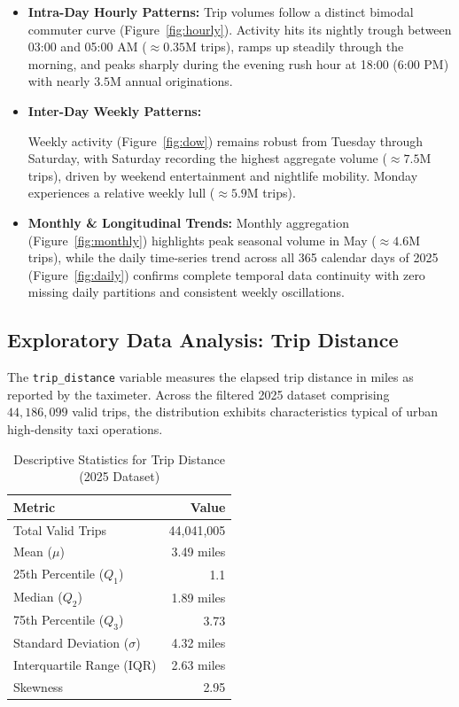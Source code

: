 \documentclass[11pt,a4paper]{article}
\begin{document}
\begin{itemize}
    \item \textbf{Intra-Day Hourly Patterns:}
     Trip volumes follow a distinct bimodal commuter curve (Figure~\ref{fig:hourly}). Activity hits its nightly trough between 03:00 and 05:00 AM ($\approx 0.35\text{M}$ trips), ramps up steadily through the morning, and peaks sharply during the evening rush hour at 18:00 (6:00 PM) with nearly $3.5\text{M}$ annual originations.
    \item 
    \textbf{Inter-Day Weekly Patterns:} 

    Weekly activity (Figure~\ref{fig:dow}) remains robust from Tuesday through Saturday, with Saturday recording the highest aggregate volume ($\approx 7.5\text{M}$ trips), driven by weekend entertainment and nightlife mobility. Monday experiences a relative weekly lull ($\approx 5.9\text{M}$ trips).
    
    \item \textbf{Monthly \& Longitudinal Trends:} 
    Monthly aggregation (Figure~\ref{fig:monthly}) highlights peak seasonal volume in May ($\approx 4.6\text{M}$ trips), while the daily time-series trend across all 365 calendar days of 2025 (Figure~\ref{fig:daily}) confirms complete temporal data continuity with zero missing daily partitions and consistent weekly oscillations.
\end{itemize}



\subsection{Exploratory Data Analysis: Trip Distance}
\label{sec:eda_trip_distance}

The \texttt{trip\_distance} variable measures the elapsed trip distance in miles as reported by the taximeter. Across the filtered 2025 dataset comprising $44,186,099$ valid trips, the distribution exhibits characteristics typical of urban high-density taxi operations.

\begin{table}[htbp]
\centering
\caption{Descriptive Statistics for Trip Distance (2025 Dataset)}
\label{tab:stats_trip_distance}
\begin{tabular}{lr}
\toprule
\textbf{Metric} & \textbf{Value} \\
\midrule
Total Valid Trips & 44,041,005 \\
Mean ($\mu$) & 3.49 miles \\
25th Percentile ($Q_1$) & 1.1 \\
Median ($Q_2$) & 1.89 miles \\
75th Percentile ($Q_3$) & 3.73 \\
Standard Deviation ($\sigma$) & 4.32 miles \\
Interquartile Range (IQR) & 2.63 miles \\
Skewness & 2.95 \\
\bottomrule
\end{tabular}
\end{table}
\end{document}
